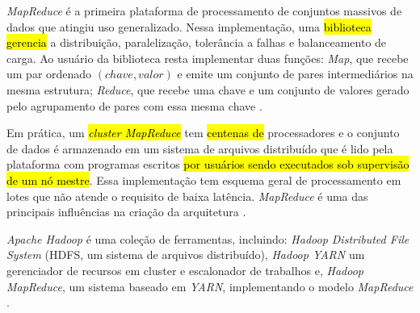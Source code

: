 \emph{MapReduce} é a primeira plataforma de processamento de conjuntos massivos
de dados que atingiu uso generalizado.
Nessa implementação, uma 
\hl{biblioteca gerencia} 
a distribuição, paralelização, tolerância a falhas e balanceamento de
carga.
Ao usuário da biblioteca resta implementar duas funções:
\emph{Map}, que recebe um par ordenado
$(chave, valor)$ e emite um conjunto de pares intermediários na mesma estrutura;
\emph{Reduce}, que recebe uma chave e um conjunto de valores gerado pelo agrupamento
de pares com essa mesma chave \cite{Dean2004}.

Em prática, um \notahl{!!}\hl{\emph{cluster MapReduce}} tem \hl{centenas de} processadores e o conjunto de dados é
armazenado em um sistema de arquivos distribuído que é lido pela plataforma com
programas escritos \hl{por usuários sendo executados sob supervisão de um nó mestre}.
Essa implementação tem esquema geral de processamento em lotes que não atende o
requisito de baixa latência.
\nobreakdash \emph{MapReduce} é uma das principais influências na criação da arquitetura
\lambdaa \cite{marz2015big}.

\emph{Apache Hadoop} é uma coleção de ferramentas, incluindo: \emph{Hadoop
Distributed File System} (HDFS, um sistema de arquivos distribuído), \emph{Hadoop
YARN} um gerenciador de recursos em cluster e escalonador de trabalhos e,
\emph{Hadoop MapReduce}, um sistema baseado em \emph{YARN}, implementando o modelo
\emph{MapReduce} \cite{ApacheHadoop2020}.




